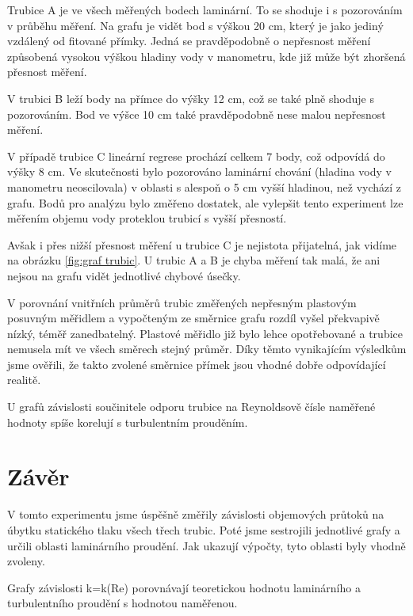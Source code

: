     Trubice A je ve všech měřených bodech laminární. To se shoduje i s pozorováním v průběhu měření. Na grafu je vidět bod s výškou 20 cm, který je jako jediný vzdálený od fitované přímky. Jedná se pravděpodobně o nepřesnost měření způsobená vysokou výškou hladiny vody v manometru, kde již může být zhoršená přesnost měření.

    V trubici B leží body na přímce do výšky 12 cm, což se také plně shoduje s pozorováním. Bod ve výšce 10 cm také pravděpodobně nese malou nepřesnost měření.

    V případě trubice C lineární regrese prochází celkem 7 body, což odpovídá do výšky 8 cm. Ve skutečnosti bylo pozorováno laminární chování (hladina vody v manometru neoscilovala) v oblasti s alespoň o 5 cm vyšší hladinou, než vychází z grafu. Bodů pro analýzu bylo změřeno dostatek, ale vylepšit tento experiment lze měřením objemu vody proteklou trubicí s vyšší přesností.

    Avšak i přes nižší přesnost měření u trubice C je nejistota přijatelná, jak vidíme na obrázku \ref{fig:graf trubic}. U trubic A a B je chyba měření tak malá, že ani nejsou na grafu vidět jednotlivé chybové úsečky.

    V porovnání vnitřních průměrů trubic změřených nepřesným plastovým posuvným měřidlem a vypočteným ze směrnice grafu rozdíl vyšel překvapivě nízký, téměř zanedbatelný. Plastové měřidlo již bylo lehce opotřebované a trubice nemusela mít ve všech směrech stejný průměr. Díky těmto vynikajícím výsledkům jsme ověřili, že takto zvolené směrnice přímek jsou vhodné dobře odpovídající realitě.

    U grafů závislosti součinitele odporu trubice na Reynoldsově čísle naměřené hodnoty spíše korelují s turbulentním prouděním.

\section{Závěr}

    V tomto experimentu jsme úspěšně změřily závislosti objemových průtoků na úbytku statického tlaku všech třech trubic. Poté jsme sestrojili jednotlivé grafy a určili oblasti laminárního proudění. Jak ukazují výpočty, tyto oblasti byly vhodně zvoleny.

    Grafy závislosti k=k(Re) porovnávají teoretickou hodnotu laminárního a turbulentního proudění s hodnotou naměřenou.

